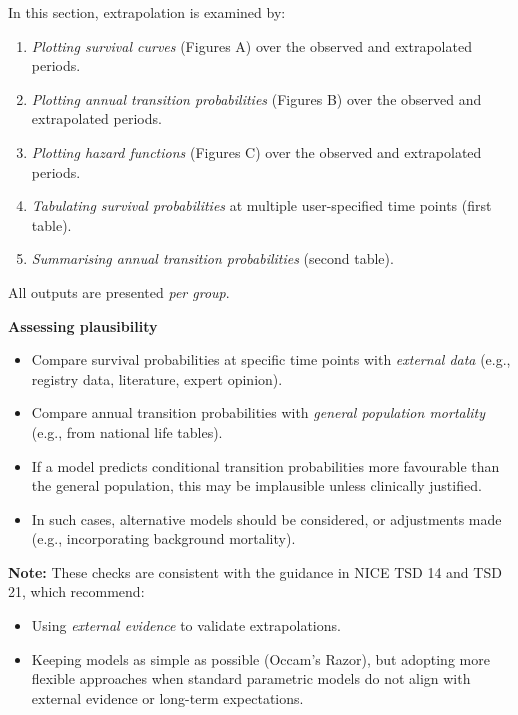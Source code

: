 \documentclass[
]{article}
\providecommand{\tightlist}{%
  \setlength{\itemsep}{0pt}\setlength{\parskip}{0pt}}
\begin{document}
In this section, extrapolation is examined by:

\begin{enumerate}
\def\labelenumi{\arabic{enumi}.}
\tightlist
\item
  \emph{Plotting survival curves} (Figures A) over the observed and
  extrapolated periods.\\
\item
  \emph{Plotting annual transition probabilities} (Figures B) over the
  observed and extrapolated periods.
\item
  \emph{Plotting hazard functions} (Figures C) over the observed and
  extrapolated periods.
\item
  \emph{Tabulating survival probabilities} at multiple user-specified
  time points (first table).
\item
  \emph{Summarising annual transition probabilities} (second table).
\end{enumerate}

All outputs are presented \emph{per group}.

\textbf{Assessing plausibility}

\begin{itemize}
\tightlist
\item
  Compare survival probabilities at specific time points with
  \emph{external data} (e.g., registry data, literature, expert
  opinion).\\
\item
  Compare annual transition probabilities with \emph{general population
  mortality} (e.g., from national life tables).\\
\item
  If a model predicts conditional transition probabilities more
  favourable than the general population, this may be implausible unless
  clinically justified.\\
\item
  In such cases, alternative models should be considered, or adjustments
  made (e.g., incorporating background mortality).
\end{itemize}

\textbf{Note:} These checks are consistent with the guidance in NICE TSD
14 and TSD 21, which recommend:

\begin{itemize}
\tightlist
\item
  Using \emph{external evidence} to validate extrapolations.\\
\item
  Keeping models as simple as possible (Occam's Razor), but adopting
  more flexible approaches when standard parametric models do not align
  with external evidence or long-term expectations.
\end{itemize}
\end{document}
